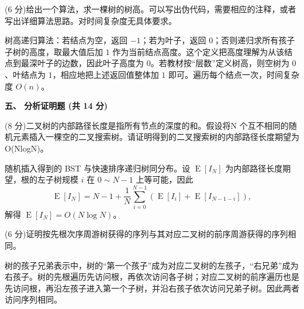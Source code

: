 \begin{question}
(6 分)给出一个算法，求一棵树的树高。可以写出伪代码，需要相应的注释，或者写出详细算法思路。对时间复杂度无具体要求。
\begin{solution}
树高递归算法：若结点为空，返回 $-1$；若为叶子，返回 $0$；否则递归求所有孩子子树的高度，取最大值后加 $1$ 作为当前结点高度。这个定义把高度理解为从该结点到最深叶子的边数，因此叶子高度为 $0$。若教材按“层数”定义树高，则空树为 $0$、叶结点为 $1$，相应地把上述返回值整体加 $1$ 即可。遍历每个结点一次，时间复杂度 $O(n)$。
\end{solution}
\end{question}

\textbf{五、 分析证明题 (共 14 分)}
\begin{question}
(8 分)二叉树的内部路径长度是指所有节点的深度的和。假设将N 个互不相同的随机元素插入一棵空的二叉搜索树。请证明得到的二叉搜索树的内部路径长度期望为 O(NlogN)。
\begin{solution}
随机插入得到的 BST 与快速排序递归树同分布。设 $\operatorname{E}[I_N]$ 为内部路径长度期望，根的左子树规模 $i$ 在 $0\sim N-1$ 上等可能，因此
  \[
  \operatorname{E}[I_N]=N-1+\frac1N\sum_{i=0}^{N-1}(\operatorname{E}[I_i]+\operatorname{E}[I_{N-1-i}]),
  \]
  解得 $\operatorname{E}[I_N]=O(N\log N)$。
\end{solution}
\end{question}

\begin{question}
(6 分)证明按先根次序周游树获得的序列与其对应二叉树的前序周游获得的序列相同。
\begin{solution}
树的孩子兄弟表示中，树的“第一个孩子”成为对应二叉树的左孩子，“右兄弟”成为右孩子。树的先根遍历先访问根，再依次访问各子树；对应二叉树的前序遍历也是先访问根，再沿左孩子进入第一个子树，并沿右孩子依次访问兄弟子树。因此两者访问序列相同。
\end{solution}
\end{question}
